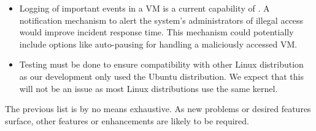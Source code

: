 \begin{itemize}
\item Logging of important events in a \ac{VM} is a current capability of . A notification mechanism to alert the system's administrators of illegal access would improve incident response time. This mechanism could potentially include options like auto-pausing for handling a maliciously accessed \ac{VM}.

\item Testing must be done to ensure compatibility with other Linux distribution as our development only used the Ubuntu distribution. We expect that this will not be an issue as most Linux distributions use the same kernel.


\end{itemize}

\par The previous list is by no means exhaustive. As new problems or desired features surface, other features or enhancements are likely to be required. 



